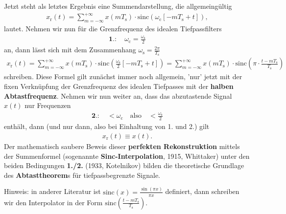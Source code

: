 \begin{mdframed}
Jetzt steht als letztes Ergebnis eine Summendarstellung, die allgemeingültig
\begin{align}
x_\mathrm{r}(t)
= \sum_{m=-\infty}^{+\infty} x(m T_\mathrm{s}) \cdot \mathrm{sinc}(\omega_\mathrm{c} [-m T_\mathrm{s} + t]),
\end{align}
lautet.
Nehmen wir nun für die Grenzfrequenz des idealen Tiefpassfilters
\begin{align}
\textbf{1.}:\quad\omega_\mathrm{c} = \frac{\omega_\mathrm{s}}{2}
\end{align}
an, dann lässt sich mit dem Zusammenhang
$\omega_\mathrm{s} = \frac{2\pi}{T_\mathrm{s}}$
\begin{align}
\label{eq:EF235EE3D8:ZeitSincInterpolation}
x_\mathrm{r}(t)=
\sum_{m=-\infty}^{+\infty} x(m T_\mathrm{s}) \cdot \mathrm{sinc}(\frac{\omega_\mathrm{s}}{2} [-m T_\mathrm{s} + t])=
\sum_{m=-\infty}^{+\infty} x(m T_\mathrm{s}) \cdot \mathrm{sinc}\left(\pi \cdot \frac{t-m T_\mathrm{s}}{T_\mathrm{s}}\right)
\end{align}
schreiben. Diese Formel gilt zunächst immer noch allgemein, 'nur' jetzt mit der
fixen Verknüpfung der Grenzfrequenz des idealen Tiefpasses mit der \textbf{halben Abtastfrequenz}.
Nehmen wir nun weiter an, dass das abzutastende Signal $x(t)$ nur Frequenzen
\begin{align}
\textbf{2.}:\quad<\omega_\mathrm{c}\quad\text{also}\quad<\frac{\omega_\mathrm{s}}{2}
\end{align}
enthält, dann (und nur dann, also bei Einhaltung von 1. und 2.) gilt
\begin{align}
x_\mathrm{r}(t) \equiv x(t).
\end{align}
Der mathematisch saubere Beweis dieser \textbf{perfekten Rekonstruktion}
mittels der Summenformel (sogenannte \textbf{Sinc-Interpolation}, 1915, Whittaker)
unter den beiden Bedingungen \textbf{1./2.} (1933, Kotelnikov) bilden die theoretische
Grundlage des \textbf{Abtasttheorem}s für tiefpassbegrenzte Signale.
%

Hinweis: in anderer Literatur ist $\mathrm{sinc}(x)=\frac{\sin(\pi x)}{\pi x}$ definiert,
dann schreiben wir den Interpolator in der Form
$\mathrm{sinc}\left(\frac{t-m T_\mathrm{s}}{T_\mathrm{s}}\right)$.
\end{mdframed}


